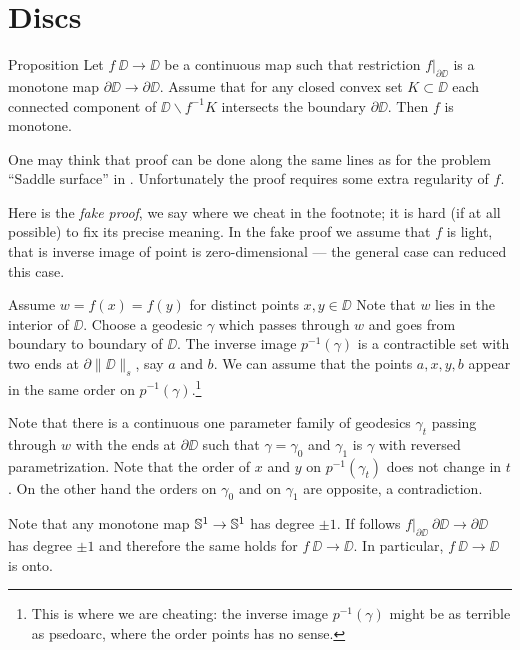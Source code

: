 \section{Discs}



\begin{thm}{Proposition}\label{prop:mono-disc}
Let $f\:\DD\to \DD$ be a continuous map such that restriction $f|_{\partial\DD}$ is a monotone map $\partial\DD\to\partial\DD$.
Assume that for any closed convex set $K\subset \DD$ each connected component of $\DD\backslash f^{-1}K$ intersects the boundary $\partial \DD$.
Then $f$ is monotone.
\end{thm}

One may think that proof can be done along the same lines as for the problem ``Saddle surface'' in \cite{petrunin-orthodox}. 
Unfortunately the proof requires some extra regularity of $f$. 

Here is the \emph{fake proof}, we say where we cheat in the footnote; 
it is hard (if at all possible) to fix its precise meaning.
In the fake proof we assume that $f$ is light, that is inverse image of point is zero-dimensional --- the general case can reduced this case.

Assume  $w=f(x)=f(y)$ for distinct points $x,y\in\DD$
Note that  $w$ lies in the interior of $\DD$.
Choose a geodesic $\gamma$ which passes through $w$ and goes 
from boundary to boundary of $\DD$.
The inverse image $p^{-1}(\gamma)$ is a contractible set with two ends at $\partial\|\DD\|_s$, say $a$ and $b$.
We can assume that the points $a,x,y,b$ appear in the same order on $p^{-1}(\gamma)$.\footnote{This is where we are cheating: the inverse image $p^{-1}(\gamma)$ might be as terrible as psedoarc, where the order points has no sense.}

Note that there is a continuous one parameter family of geodesics $\gamma_t$ passing through $w$ with the ends at $\partial \DD$
such that $\gamma=\gamma_0$ and $\gamma_1$ is $\gamma$ with reversed parametrization.
Note that the order of $x$ and $y$ on $p^{-1}(\gamma_t)$ does not change in $t$.
On the other hand the orders on $\gamma_0$ and on $\gamma_1$ are opposite, a contradiction.\qeds 

Note that any monotone map $\mathbb{S}^1\to\mathbb{S}^1$ has degree $\pm1$.
If follows $f|_{\partial\DD}\:\partial\DD\to\partial\DD$ has degree $\pm1$
and therefore the same holds for $f\:\DD\to\DD$.
In particular, $f\:\DD\to\DD$ is onto.

